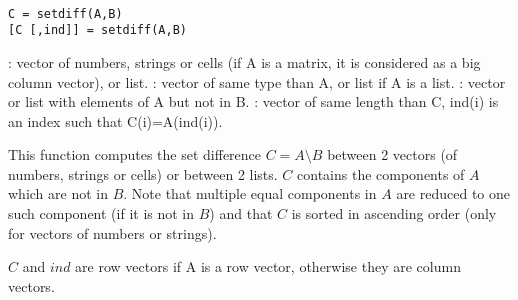 
\begin{mandesc}
   \\
\end{mandesc}

\begin{calling_sequence}
\begin{verbatim}
C = setdiff(A,B)
[C [,ind]] = setdiff(A,B)
\end{verbatim}
\end{calling_sequence}
\begin{parameters}
  \begin{varlist}
     : vector of numbers, strings or cells (if A is a matrix, it is
    considered as a big column vector), or list.
     : vector of same type than A, or list if A is a list. 
     : vector or list with elements of A but not in B.
     : vector of same length than C, ind(i) is an index
                  such that C(i)=A(ind(i)).
  \end{varlist}
\end{parameters}

\begin{mandescription}
  This function computes the set difference $C = A \setminus B$
  between 2 vectors (of numbers, strings or cells) or between 2
  lists. $C$ contains the components
  of $A$ which are not in $B$. Note that multiple equal components in
  $A$ are reduced to one such component (if it is not in $B$) and that
  $C$ is sorted in ascending order (only for vectors of numbers or strings).

  $C$ and $ind$ are row vectors if  A is a row vector, otherwise they
  are column vectors.
  
\end{mandescription}

